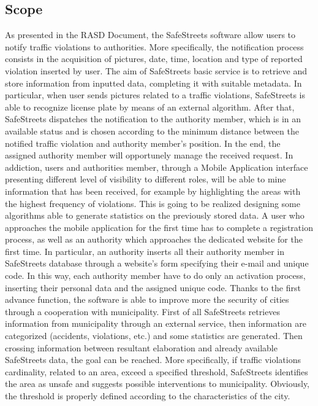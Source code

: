 \documentclass[12pt]{article}
\begin{document}
\subsection{Scope}
\vspace{5mm}
As presented in the RASD Document, the SafeStreets software allow users to notify traffic violations to authorities. More specifically, the notification process consists in the acquisition of pictures, date, time, location and type of reported violation inserted by user. The aim of SafeStreets basic service is to retrieve and store information from inputted data, completing it with suitable metadata.  In particular, when user sends pictures related to a traffic violations, SafeStreets is able to recognize license plate by means of an external algorithm. After that, SafeStreets dispatches the notification to the authority member, which is in an available status and is chosen according to the minimum distance between the notified traffic violation and authority member’s position. In the end, the assigned authority member will opportunely manage the received request. In addiction, users and authorities member, through a Mobile Application interface presenting different level of visibility to different roles, will be able to mine information that has been received, for example by highlighting the areas with the highest frequency of violations. This is going to be realized designing some algorithms able to generate statistics on the previously stored data. A user who approaches the mobile application for the first time has to complete a registration process, as well as an authority which approaches the dedicated website for the first time. In particular, an authority inserts all their authority member in SafeStreets database through a website’s form specifying their e-mail and unique code. In this way, each authority member have to do only an activation process, inserting their personal data and the assigned unique code.
Thanks to the first advance function, the software is able to improve more the security of cities through a cooperation with municipality. First of all SafeStreets retrieves information from municipality through an external service, then information are categorized (accidents, violations, etc.) and some statistics are generated. Then crossing information between resultant elaboration and already available SafeStreets data, the goal can be reached. More specifically, if traffic violations cardinality, related to an area, exceed a specified threshold, SafeStreets identifies the area as unsafe and suggests possible interventions to municipality. Obviously, the threshold is properly defined according to the characteristics of the city.
\end{document}

